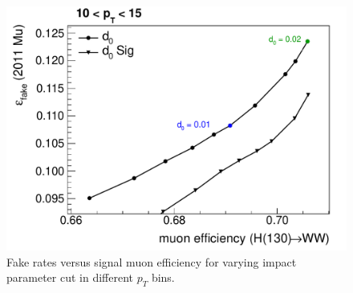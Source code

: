 \begin{figure}[!htbp]
\begin{center}
\includegraphics[scale=0.4]{figures/ipscan2.pdf}
\caption{Fake rates versus signal muon efficiency for varying impact parameter cut in different $p_T$ bins.}
\label{fig:ipscan}
\end{center}
\end{figure}

